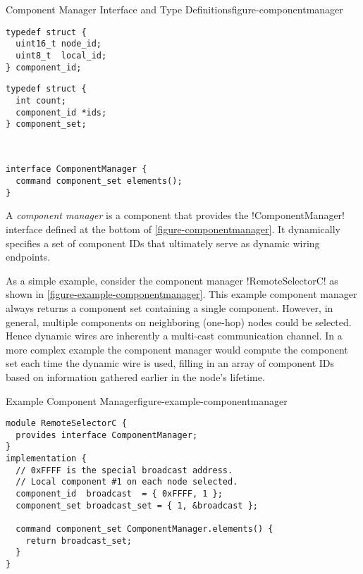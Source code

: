 \begin{fpfig}[t]{Component Manager Interface and Type Definitions}{figure-componentmanager}
{
\begin{minipage}[t]{2.5in}
\singlespace
\begin{lstlisting}
typedef struct {
  uint16_t node_id;
  uint8_t  local_id;
} component_id;
\end{lstlisting}
\primaryspacing
\end{minipage}
\hfill
\begin{minipage}[t]{2.5in}
\singlespace
\begin{lstlisting}
typedef struct {
  int count;
  component_id *ids;
} component_set;
\end{lstlisting}
\primaryspacing
\end{minipage}
\\
\centering
\begin{minipage}[t]{5in}
\vspace{1.5em}
\singlespace
\begin{lstlisting}
interface ComponentManager {
  command component_set elements();
}
\end{lstlisting}
\primaryspacing
\end{minipage}
}
\end{fpfig}

A \emph{component manager} is a component that provides the !ComponentManager! interface defined
at the bottom of \autoref{figure-componentmanager}. It dynamically specifies a set of component
IDs that ultimately serve as dynamic wiring endpoints.

As a simple example, consider the component manager !RemoteSelectorC! as shown in
\autoref{figure-example-componentmanager}. This example component manager always returns a
component set containing a single component. However, in general, multiple components on
neighboring (one-hop) nodes could be selected. Hence dynamic wires are inherently a multi-cast
communication channel. In a more complex example the component manager would compute the
component set each time the dynamic wire is used, filling in an array of component IDs based on
information gathered earlier in the node's lifetime.

\begin{fpfig}[t]{Example Component Manager}{figure-example-componentmanager}
{
\singlespace
\begin{lstlisting}
module RemoteSelectorC {
  provides interface ComponentManager;
}
implementation {
  // 0xFFFF is the special broadcast address.
  // Local component #1 on each node selected.
  component_id  broadcast  = { 0xFFFF, 1 };
  component_set broadcast_set = { 1, &broadcast };

  command component_set ComponentManager.elements() {
    return broadcast_set;
  }
}
\end{lstlisting}
\primaryspacing
}
\end{fpfig}

